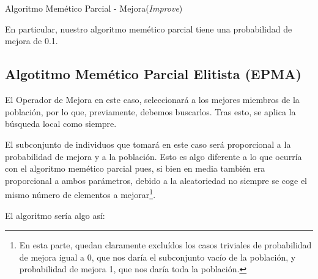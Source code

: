 \documentclass[a4paper, 11pt]{article}
\begin{document}
			\begin{algorithm}[H]
				\begin{algorithmic}[1]
				\REQUIRE \ \\
						 \
						
						\ENDIF
					\ENDIF
				\ENDFOR
				\end{algorithmic}
			\caption{Algoritmo Memético Parcial - Mejora(\textit{Improve})}
			\label{PMA-Improve}
			\end{algorithm}
			
			En particular, nuestro algoritmo memético parcial tiene una probabilidad de mejora de 0.1.
		
		\subsection{Algotitmo Memético Parcial Elitista (\textbf{EPMA})}
			El Operador de Mejora en este caso, seleccionará a los mejores miembros de la población, por
			lo que, previamente, debemos buscarlos. Tras esto, se aplica la búsqueda local como siempre.
			
			El subconjunto de individuos que tomará en este caso será proporcional a la probabilidad de
			mejora y a la población. Esto es algo diferente a lo que ocurría con el algoritmo memético
			parcial pues, si bien en media también era proporcional a ambos parámetros, debido a la
			aleatoriedad no siempre se coge el mismo número de elementos a mejorar\footnote{En esta
			parte, quedan claramente excluídos los casos triviales de probabilidad de mejora igual a 0,
			que nos daría el subconjunto vacío de la población, y probabilidad de mejora 1, que nos
			daría toda la población.}.
			
			El algoritmo sería algo así:
			
\end{document}
